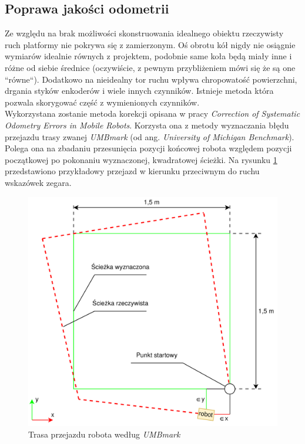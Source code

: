 \subsection{Poprawa jakości odometrii}
\label{sec:umbmark}
Ze względu na brak możliwości skonstruowania idealnego obiektu rzeczywisty ruch platformy nie pokrywa się z zamierzonym. Oś obrotu kół nigdy nie osiągnie wymiarów idealnie równych z projektem, podobnie same koła będą miały inne i różne od siebie średnice (oczywiście, z pewnym przybliżeniem mówi się że są one ``równe``). Dodatkowo na nieidealny tor ruchu wpływa chropowatość powierzchni, drgania styków enkoderów i wiele innych czynników. Istnieje metoda która pozwala skorygować część z wymienionych czynników.
\\

Wykorzystana zostanie metoda korekcji opisana w pracy \emph{Correction of Systematic Odometry Errors in Mobile Robots}\cite{Borenstein1995}. Korzysta ona z metody wyznaczania błędu przejazdu trasy zwanej \emph{UMBmark} (od ang. \emph{University of Michigan Benchmark}). Polega ona na zbadaniu przesunięcia pozycji końcowej robota względem pozycji początkowej po pokonaniu wyznaczonej, kwadratowej ścieżki. Na rysunku \ref{fig:umbenchmark-path} przedstawiono przykładowy przejazd w kierunku przeciwnym do ruchu wskazówek zegara.

\begin{figure}[ht]
	\centering
		\includegraphics[width=0.8\linewidth]{rys/umbenchmark-path.pdf}
	\caption{Trasa przejazdu robota według \emph{UMBmark}}
	\label{fig:umbenchmark-path}
\end{figure}

